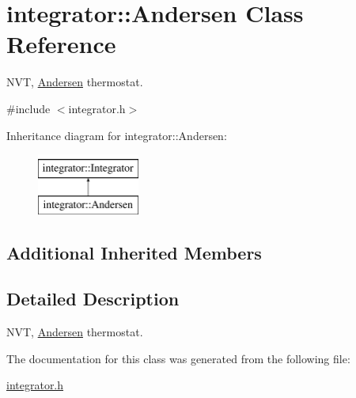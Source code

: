 \hypertarget{classintegrator_1_1Andersen}{\section{integrator\-:\-:Andersen Class Reference}
\label{classintegrator_1_1Andersen}
}


N\-V\-T, \hyperlink{classintegrator_1_1Andersen}{Andersen} thermostat.  




{\ttfamily \#include $<$integrator.\-h$>$}

Inheritance diagram for integrator\-:\-:Andersen\-:\begin{figure}[H]
\begin{center}
\leavevmode
\includegraphics[height=2.000000cm]{classintegrator_1_1Andersen}
\end{center}
\end{figure}
\subsection*{Additional Inherited Members}


\subsection{Detailed Description}
N\-V\-T, \hyperlink{classintegrator_1_1Andersen}{Andersen} thermostat. 

The documentation for this class was generated from the following file\-:\begin{DoxyCompactItemize}
\item 
\hyperlink{integrator_8h}{integrator.\-h}\end{DoxyCompactItemize}
